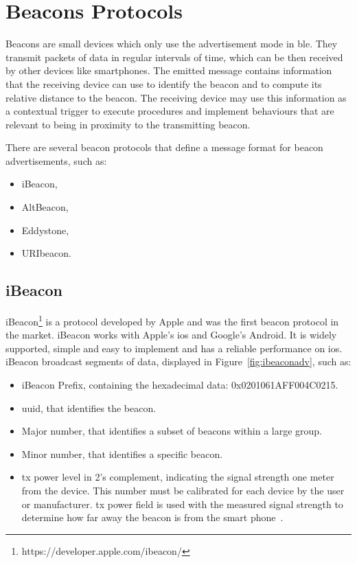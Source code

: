 	
\section{Beacons Protocols}
\label{section:protocols}
Beacons are small devices which only use the advertisement mode in \gls{ble}. They transmit packets of data in regular intervals of time, which can be then received by other devices like smartphones. The emitted message contains information that the receiving device can use to identify the beacon and to compute its relative distance to the beacon. The receiving device may use this information as a contextual trigger to execute procedures and implement behaviours that are relevant to being in proximity to the transmitting beacon.

There are several beacon protocols that define a message format for beacon advertisements, such as: 
\begin{itemize}
\item iBeacon,
\item AltBeacon,
\item Eddystone,
\item URIbeacon.
\end{itemize}

\subsection{iBeacon}
\label{subsection:ibeacon}
iBeacon\footnote{https://developer.apple.com/ibeacon/} is a protocol developed by Apple and was the first beacon protocol in the market. iBeacon works with Apple's \gls{ios} and Google's Android. It is widely supported, simple and easy to implement and has a reliable performance on \gls{ios}.
iBeacon broadcast segments of data, displayed in Figure~\ref{fig:ibeaconadv}, such as:
\begin{itemize}
\item iBeacon Prefix, containing the hexadecimal data: 0x0201061AFF004C0215.
\item \gls{uuid}, that identifies the beacon.
\item Major number, that identifies a subset of beacons within a large group.
\item Minor number, that identifies a specific beacon.
\item \gls{tx} power level in 2's complement, indicating the signal strength one meter from the device. This number must be calibrated for each device by the user or manufacturer. \gls{tx} power field is used with the measured signal strength to determine how far away the beacon is from the smart phone~\citep{smartanaibeacon}.
\end{itemize}

